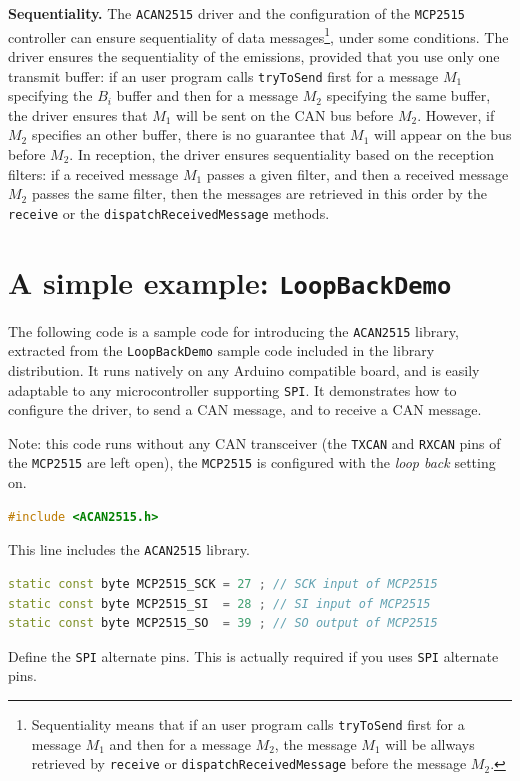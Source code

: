 \documentclass[10pt, a4paper, obeyspaces, openany]{extarticle}
\begin{document}
{\bf Sequentiality.} The \texttt{ACAN2515} driver and the configuration of the \texttt{MCP2515} controller can ensure sequentiality of data messages\footnote{Sequentiality means that if an user program calls \texttt{tryToSend} first for a message $M_1$ and then for a message $M_2$, the message $M_1$ will be allways retrieved by \texttt{receive} or \texttt{dispatchReceivedMessage} before the message $M_2$.}, under some conditions. The driver ensures the sequentiality of the emissions, provided that you use only one transmit buffer: if an user program calls \texttt{tryToSend} first for a message $M_1$ specifying the $B_i$ buffer and then for a message $M_2$ specifying the same buffer, the driver ensures that $M_1$ will be sent on the CAN bus before $M_2$. However, if $M_2$ specifies an other buffer, there is no guarantee that $M_1$ will appear on the bus before $M_2$. In reception, the driver ensures sequentiality based on the reception filters: if a received message $M_1$ passes a given filter, and then a received message $M_2$ passes the same filter, then the messages are retrieved in this order by the \texttt{receive} or the \texttt{dispatchReceivedMessage} methods.



\section{A simple example: \texttt{LoopBackDemo}}

The following code is a sample code for introducing the \texttt{ACAN2515} library, extracted from the \texttt{LoopBackDemo} sample code included in the library distribution. It runs natively on any Arduino compatible board, and is easily adaptable to any microcontroller supporting \texttt{SPI}. It demonstrates how to configure the driver, to send a CAN message, and to receive a CAN message.

Note: this code runs without any CAN transceiver (the \texttt{TXCAN} and \texttt{RXCAN} pins of the \texttt{MCP2515} are left open), the \texttt{MCP2515} is configured with the \emph{loop back} setting on.

{ \small\begin{lstlisting}[language=c++]
#include <ACAN2515.h>
\end{lstlisting}}

This line includes the \texttt{ACAN2515} library.

{ \small\begin{lstlisting}[language=c++]
static const byte MCP2515_SCK = 27 ; // SCK input of MCP2515 
static const byte MCP2515_SI  = 28 ; // SI input of MCP2515  
static const byte MCP2515_SO  = 39 ; // SO output of MCP2515 
\end{lstlisting}}
Define the \texttt{SPI} alternate pins. This is actually required if you uses \texttt{SPI} alternate pins.
\end{document}
